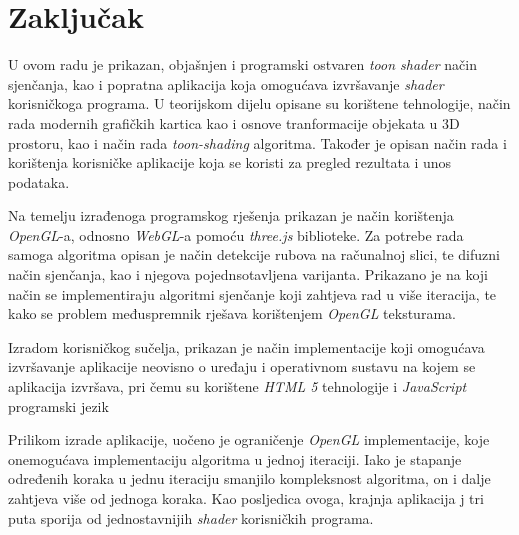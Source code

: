 \section{Zaključak}

U ovom radu je prikazan, objašnjen i programski ostvaren \emph{toon shader} način sjenčanja, kao i popratna aplikacija koja omogućava izvršavanje \emph{shader} korisničkoga programa. U teorijskom dijelu opisane su korištene tehnologije, način rada modernih grafičkih kartica kao i osnove tranformacije objekata u 3D prostoru, kao i način rada \emph{toon-shading} algoritma. Također je opisan način rada i korištenja korisničke aplikacije koja se koristi za pregled rezultata i unos podataka.

Na temelju izrađenoga programskog rješenja prikazan je način korištenja \emph{OpenGL}-a, odnosno \emph{WebGL}-a pomoću \emph{three.js} biblioteke. Za potrebe rada samoga algoritma opisan je način detekcije rubova na računalnoj slici, te difuzni način sjenčanja, kao i njegova pojednsotavljena varijanta. Prikazano je na koji način se implementiraju algoritmi sjenčanje koji zahtjeva rad u više iteracija, te kako se problem međuspremnik rješava korištenjem \emph{OpenGL} teksturama.

Izradom korisničkog sučelja, prikazan je način implementacije koji omogućava izvršavanje aplikacije neovisno o uređaju i operativnom sustavu na kojem se aplikacija izvršava, pri čemu su korištene \emph{HTML 5} tehnologije i \emph{JavaScript} programski jezik

Prilikom izrade aplikacije, uočeno je ograničenje \emph{OpenGL} implementacije, koje onemogućava implementaciju algoritma u jednoj iteraciji. Iako je stapanje određenih koraka u jednu iteraciju smanjilo kompleksnost algoritma, on i dalje zahtjeva više od jednoga koraka. Kao posljedica ovoga, krajnja aplikacija j tri puta sporija od jednostavnijih \emph{shader}  korisničkih programa.